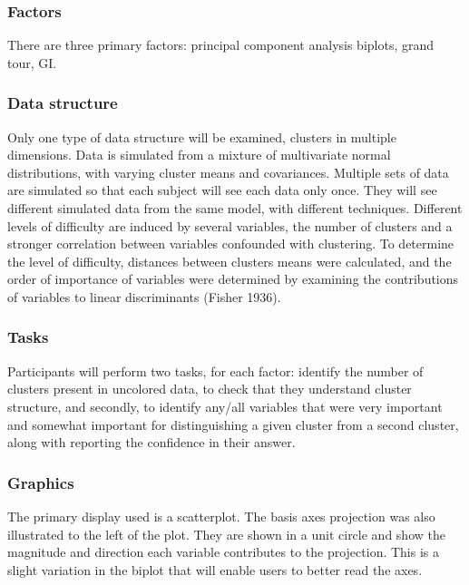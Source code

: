 \documentclass[
  11,
]{article}
\begin{document}
\hypertarget{sec:factors}{%
\subsubsection{Factors}\label{sec:factors}}

There are three primary factors: principal component analysis biplots, grand tour, GI.

\hypertarget{data-structure}{%
\subsubsection{Data structure}\label{data-structure}}

Only one type of data structure will be examined, clusters in multiple dimensions. Data is simulated from a mixture of multivariate normal distributions, with varying cluster means and covariances. Multiple sets of data are simulated so that each subject will see each data only once. They will see different simulated data from the same model, with different techniques. Different levels of difficulty are induced by several variables, the number of clusters and a stronger correlation between variables confounded with clustering. To determine the level of difficulty, distances between clusters means were calculated, and the order of importance of variables were determined by examining the contributions of variables to linear discriminants (Fisher 1936).

\hypertarget{sec:tasks}{%
\subsubsection{Tasks}\label{sec:tasks}}

Participants will perform two tasks, for each factor: identify the number of clusters present in uncolored data, to check that they understand cluster structure, and secondly, to identify any/all variables that were very important and somewhat important for distinguishing a given cluster from a second cluster, along with reporting the confidence in their answer.

\hypertarget{graphics}{%
\subsubsection{Graphics}\label{graphics}}

The primary display used is a scatterplot. The basis axes projection was also illustrated to the left of the plot. They are shown in a unit circle and show the magnitude and direction each variable contributes to the projection. This is a slight variation in the biplot that will enable users to better read the axes.
\end{document}
